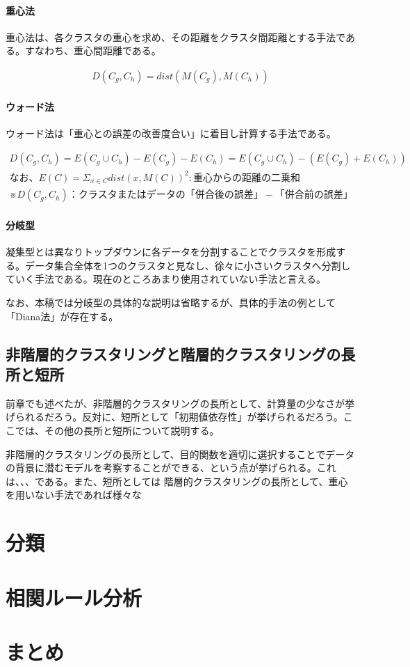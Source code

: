 \documentclass[dvipdfmx]{jsarticle}
\begin{document}
\paragraph{重心法}
重心法は、各クラスタの重心を求め、その距離をクラスタ間距離とする手法である。すなわち、重心間距離である。
\begin{center}
  \begin{eqnarray*}
    D(C_{g}, C_{h}) = dist(M(C_{g}), M(C_{h}))
  \end{eqnarray*}
\end{center}
\paragraph{ウォード法}
ウォード法は「重心との誤差の改善度合い」に着目し計算する手法である。
\begin{center}
\begin{eqnarray*}
  D(C_{g}, C_{h}) = E(C_{g}\cup C_{h}) - E(C_{g}) - E(C_{h})
  = E(C_{g}\cup C_{h}) - (E(C_{g}) + E(C_{h})) \\
  なお、
  E(C) = \Sigma_{x\in C}dist(x, M(C))^{2} : 重心からの距離の二乗和\\
  ※D(C_{g}, C_{h})：クラスタまたはデータの「併合後の誤差」-「併合前の誤差」
\end{eqnarray*}
\end{center}
\paragraph{分岐型}
凝集型とは異なりトップダウンに各データを分割することでクラスタを形成する。データ集合全体を1つのクラスタと見なし、徐々に小さいクラスタへ分割していく手法である。現在のところあまり使用されていない手法と言える。\par
なお、本稿では分岐型の具体的な説明は省略するが、具体的手法の例として「Diana法」が存在する。\par
\subsection{非階層的クラスタリングと階層的クラスタリングの長所と短所}
前章でも述べたが、非階層的クラスタリングの長所として、計算量の少なさが挙げられるだろう。反対に、短所として「初期値依存性」が挙げられるだろう。ここでは、その他の長所と短所について説明する。\par
非階層的クラスタリングの長所として、目的関数を適切に選択することでデータの背景に潜むモデルを考察することができる、という点が挙げられる。これは、、、である。また、短所としては
階層的クラスタリングの長所として、重心を用いない手法であれば様々な


\section{分類}
\section{相関ルール分析}
\section{まとめ}
\end{document}
